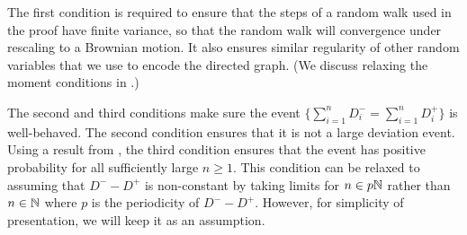 The first condition is required to ensure that the steps of a random walk used in the proof have finite variance, so that the random walk will convergence under rescaling to a Brownian motion. It also ensures similar regularity of other random variables that we use to encode the directed graph. (We discuss relaxing the moment conditions in .)

The second and third conditions make sure the event $\{\sum_{i=1}^n D^-_i = \sum_{i=1}^n D^+_i\}$ is well-behaved. The second condition ensures that it is not a large deviation event. Using a result from \citet[Page 42, P1]{spitzerPrinciplesRandomWalk1964}, the third condition ensures that the event has positive probability for all sufficiently large $n \geq 1$. This condition can be relaxed to assuming that $D^- - D^+$ is non-constant by taking limits for $n \in p {\mathbb N}$ rather than $n \in {\mathbb N}$ where $p$ is the periodicity of $D^- - D^+$. However, for simplicity of presentation, we will keep it as an assumption.

